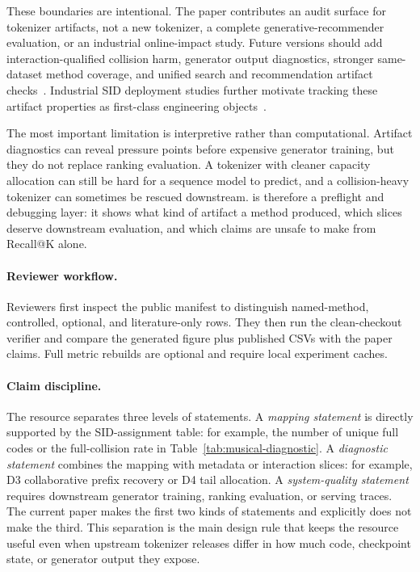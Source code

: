 These boundaries are intentional. The paper contributes an audit surface for
tokenizer artifacts, not a new \sid tokenizer, a complete
generative-recommender evaluation, or an industrial online-impact study.
Future versions should add interaction-qualified collision harm, generator
output diagnostics, stronger same-dataset method coverage, and unified search
and recommendation artifact checks~\cite{penha2025jointsid}. Industrial SID
deployment studies further motivate tracking these artifact properties as
first-class engineering objects~\cite{ju2026snapchatsid}.

The most important limitation is interpretive rather than computational.
Artifact diagnostics can reveal pressure points before expensive generator
training, but they do not replace ranking evaluation. A tokenizer with cleaner
capacity allocation can still be hard for a sequence model to predict, and a
collision-heavy tokenizer can sometimes be rescued downstream. \tool is
therefore a preflight and debugging layer: it shows what kind of artifact a
method produced, which slices deserve downstream evaluation, and which claims
are unsafe to make from Recall@K alone.

\paragraph{Reviewer workflow.}
Reviewers first inspect the public manifest to distinguish named-method,
controlled, optional, and literature-only rows. They then run the clean-checkout
verifier and compare the generated figure plus published CSVs with the paper
claims. Full metric rebuilds are optional and require local experiment caches.

\paragraph{Claim discipline.}
The resource separates three levels of statements. A \emph{mapping statement}
is directly supported by the SID-assignment table: for example, the number of
unique full codes or the full-collision rate in
Table~\ref{tab:musical-diagnostic}. A \emph{diagnostic statement} combines the
mapping with metadata or interaction slices: for example, D3 collaborative
prefix recovery or D4 tail allocation. A \emph{system-quality statement}
requires downstream generator training, ranking evaluation, or serving traces.
The current paper makes the first two kinds of statements and explicitly does
not make the third. This separation is the main design rule that keeps the
resource useful even when upstream tokenizer releases differ in how much code,
checkpoint state, or generator output they expose.

